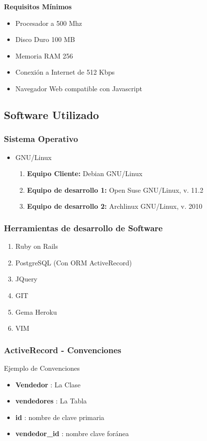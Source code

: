 \documentclass{beamer}
\begin{document}
\begin{frame}
\textbf{Requisitos Mínimos}
\begin{itemize}
\item Procesador a 500 Mhz
\item Disco Duro 100 MB
\item Memoria RAM 256
\item Conexión a Internet de 512 Kbps
\item Navegador Web compatible con Javascript
\end{itemize}
\end{frame}

\subsection{Software Utilizado}

\begin{frame}
\frametitle{Sistema Operativo}
\begin{itemize}
\item GNU/Linux
\begin{enumerate}
\pause
\item \textbf{Equipo Cliente:} Debian GNU/Linux \pause
\item \textbf{Equipo de desarrollo 1:} Open Suse GNU/Linux, v. 11.2 \pause
\item \textbf{Equipo de desarrollo 2:} Archlinux GNU/Linux, v. 2010 \pause
\end{enumerate}
\end{itemize}
\end{frame}

\begin{frame}
\frametitle{Herramientas de desarrollo de Software}
\begin{enumerate}
\pause
\item \alert{Ruby on Rails} \pause
\item \alert{PostgreSQL (Con ORM ActiveRecord)} \pause
\item JQuery \pause
\item GIT \pause
\item Gema Heroku \pause
\item VIM
\end{enumerate}
\end{frame}

\begin{frame}
\frametitle{ActiveRecord - Convenciones}
Ejemplo de Convenciones
\begin{itemize}
\item \textbf{Vendedor} : La Clase
\item \textbf{vendedores} : La Tabla
\item \textbf{id} : nombre de clave primaria
\item \textbf{vendedor\_id} : nombre clave foránea
\end{itemize}
\end{frame}
\end{document}
